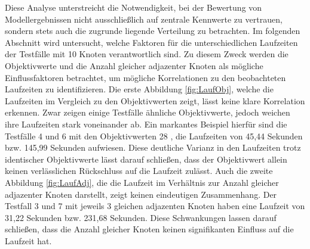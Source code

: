 \documentclass[bachelor, german]{algothesis}
\begin{document}
Diese Analyse unterstreicht die Notwendigkeit, bei der Bewertung von Modellergebnissen nicht ausschließlich auf zentrale Kennwerte zu vertrauen, sondern stets auch die zugrunde liegende Verteilung zu betrachten.\newline 
Im folgenden Abschnitt wird untersucht, welche Faktoren für die unterschiedlichen Laufzeiten der Testfälle mit 10 Knoten verantwortlich sind. Zu diesem Zweck werden die Objektivwerte und die Anzahl gleicher adjazenter Knoten als mögliche Einflussfaktoren betrachtet, um mögliche Korrelationen zu den beobachteten Laufzeiten zu identifizieren.\newline 
Die erste Abbildung \ref{fig:LaufObj}, welche die Laufzeiten im Vergleich zu den Objektivwerten zeigt, lässt keine klare Korrelation erkennen. Zwar zeigen einige Testfälle ähnliche Objektivwerte, jedoch weichen ihre Laufzeiten stark voneinander ab. Ein markantes Beispiel hierfür sind die Testfälle 4 und 6 mit den Objektivwerten 28 , die Laufzeiten von 45,44 Sekunden bzw. 145,99 Sekunden aufwiesen. Diese deutliche Varianz in den Laufzeiten trotz identischer Objektivwerte lässt darauf schließen, dass der Objektivwert allein keinen verlässlichen Rückschluss auf die Laufzeit zulässt.\newline 
Auch die zweite Abbildung \ref{fig:LaufAdj}, die die Laufzeit im Verhältnis zur Anzahl gleicher adjazenter Knoten darstellt, zeigt keinen eindeutigen Zusammenhang. Der Testfall 3 und 7 mit jeweils 3 gleichen adjazenten Knoten haben  eine Laufzeit von 31,22 Sekunden bzw. 231,68 Sekunden. Diese Schwankungen lassen darauf schließen, dass die Anzahl gleicher Knoten keinen signifikanten Einfluss auf die Laufzeit hat.
\end{document}

